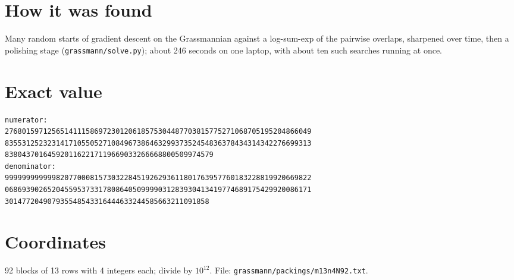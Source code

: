 \documentclass[11pt,a4paper]{article}
\begin{document}
\section{How it was found}
Many random starts of gradient descent on the Grassmannian against a log-sum-exp of the pairwise overlaps, sharpened over time, then a polishing stage (\texttt{grassmann/solve.py}); about 246 seconds on one laptop, with about ten such searches running at once.


\appendix
\section{Exact value}
{\small
\begin{verbatim}
numerator:
276801597125651411158697230120618575304487703815775271068705195204866049
835531252323141710550527108496738646329937352454836378434314342276699313
8380437016459201162217119669033266668800509974579
denominator:
999999999999820770008157303228451926293611801763957760183228819920669822
068693902652045595373317808640509999031283930413419774689175429920086171
301477204907935548543316444633244585663211091858
\end{verbatim}}

\section{Coordinates}
92 blocks of 13 rows with 4 integers each; divide by $10^{12}$. File: \texttt{grassmann/packings/m13n4N92.txt}.
{\tiny
\begin{multicols}{3}
\end{multicols}}
\end{document}
